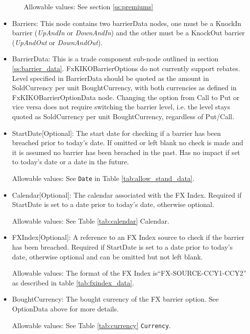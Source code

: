 \begin{itemize}
\begin{itemize}
Allowable values:  See section \ref{ss:premiums}

\end{itemize}



\item Barriers: This node contains two barrierData nodes, one must be a KnockIn barrier (\emph{UpAndIn} or \emph{DownAndIn})  and the other must be a KnockOut barrier (\emph{UpAndOut} or \emph{DownAndOut}).
\item BarrierData: This is a trade component sub-node outlined in section \ref{ss:barrier_data}. FxKIKOBarrierOptions do not currently support rebates.
Level specified in BarrierData should be quoted as the amount in SoldCurrency per unit BoughtCurrency, with both currencies as defined in FxKIKOBarrierOptionData node.
Changing the option from Call to Put or vice versa does not require switching the barrier level, i.e. the level stays quoted as SoldCurrency per unit BoughtCurrency, regardless of Put/Call.

\item StartDate[Optional]: The start date for checking if a barrier has been breached prior to today's date.  If omitted or left blank no check is made and it is assumed no barrier has been breached in the past. Has no impact if set to today's date or a date in the future.

Allowable values:  See \lstinline!Date! in Table \ref{tab:allow_stand_data}.

\item Calendar[Optional]: The calendar associated with the FX Index. Required if StartDate is set to a date prior to today's date, otherwise optional.

Allowable values: See Table \ref{tab:calendar} Calendar.

\item FXIndex[Optional]: A reference to an FX Index source to check if the barrier has been breached. Required if StartDate is set to a date prior to today's date, otherwise optional and can be omitted but not left blank.

Allowable values:  The format of the FX Index is``FX-SOURCE-CCY1-CCY2'' as described in table \ref{tab:fxindex_data}. 

\item BoughtCurrency: The bought currency of the FX barrier option. See OptionData above for more details.

Allowable values:  See Table \ref{tab:currency} \lstinline!Currency!.


\end{itemize}
